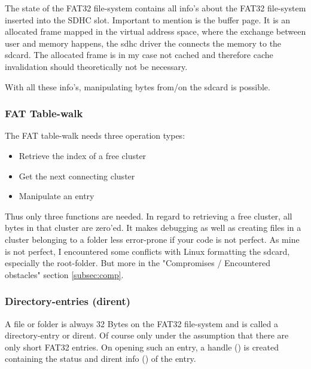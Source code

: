 The state of the FAT32 file-system contains all info's about the FAT32 file-system inserted into the SDHC slot. Important to mention is the buffer page. It is an allocated frame mapped in the virtual address space, where the exchange between user and memory happens, the sdhc driver the connects the memory to the sdcard. The allocated frame is in my case not cached and therefore cache invalidation should theoretically not be necessary. 

With all these info's, manipulating bytes from/on the sdcard is possible.

\subsubsection{FAT Table-walk}
The FAT table-walk needs three operation types: 
\begin{itemize}
\item Retrieve the index of a free cluster
\item Get the next connecting cluster
\item Manipulate an entry
\end{itemize}

Thus only three functions are needed. In regard to retrieving a free cluster, all bytes in that cluster are zero'ed. It makes debugging as well as creating files in a cluster belonging to a folder less error-prone if your code is not perfect. As mine is not perfect, I encountered some conflicts with Linux formatting the sdcard, especially the root-folder. But more in the "Compromises / Encountered obstacles" section \ref{subsec:comp}.

\subsubsection{Directory-entries (dirent)}
A file or folder is always 32 Bytes on the FAT32 file-system and is called a directory-entry or dirent. Of course only under the assumption that there are only short FAT32 entries. On opening such an entry, a handle () is created containing the status and dirent info () of the entry.

